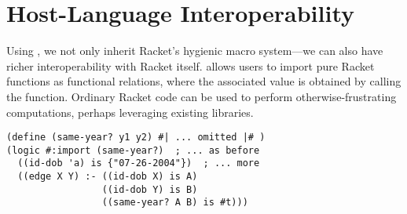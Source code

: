 \documentclass[dvipsnames,sigplan,screen,review,anonymous,acmthm,nonacm]{acmart}
\begin{document}
\begin{figure}[h]
  \begin{center}
  \end{center}
\end{figure}

\section{Host-Language Interoperability}


Using \syntaxspec{}, we not only inherit Racket's hygienic macro system---we can
also have richer interoperability with Racket itself. \miniDusa{} allows users
to import pure Racket functions as functional relations, where the
associated value is obtained by calling the function. Ordinary Racket code can
be used to perform otherwise-frustrating computations, perhaps leveraging
existing libraries.

\begin{verbatim}
(define (same-year? y1 y2) #| ... omitted |# )
(logic #:import (same-year?)  ; ... as before
  ((id-dob 'a) is {"07-26-2004"})  ; ... more
  ((edge X Y) :- ((id-dob X) is A)
                 ((id-dob Y) is B)
                 ((same-year? A B) is #t)))
\end{verbatim}
\end{document}

